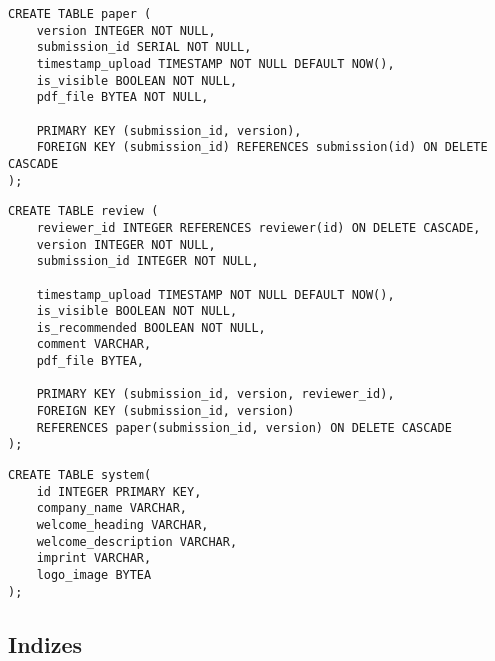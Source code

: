 \begin{lstlisting}[caption={DDL von Papers}]
CREATE TABLE paper (
	version INTEGER NOT NULL,
	submission_id SERIAL NOT NULL,
	timestamp_upload TIMESTAMP NOT NULL DEFAULT NOW(),
	is_visible BOOLEAN NOT NULL,
	pdf_file BYTEA NOT NULL,

	PRIMARY KEY (submission_id, version),
	FOREIGN KEY (submission_id) REFERENCES submission(id) ON DELETE CASCADE
);
\end{lstlisting}

\begin{lstlisting}[caption={DDL von Gutachten}]
CREATE TABLE review (
	reviewer_id INTEGER REFERENCES reviewer(id) ON DELETE CASCADE,
	version INTEGER NOT NULL,
	submission_id INTEGER NOT NULL,

	timestamp_upload TIMESTAMP NOT NULL DEFAULT NOW(),
	is_visible BOOLEAN NOT NULL,
	is_recommended BOOLEAN NOT NULL,
	comment VARCHAR,
	pdf_file BYTEA,

	PRIMARY KEY (submission_id, version, reviewer_id),
	FOREIGN KEY (submission_id, version)
	REFERENCES paper(submission_id, version) ON DELETE CASCADE
);
\end{lstlisting}

\begin{lstlisting}[caption={DDL von den Systemeinstellungen}]
CREATE TABLE system(
	id INTEGER PRIMARY KEY,
	company_name VARCHAR,
	welcome_heading VARCHAR,
	welcome_description VARCHAR,
	imprint VARCHAR,
	logo_image BYTEA
);
\end{lstlisting}

\subsection{Indizes}